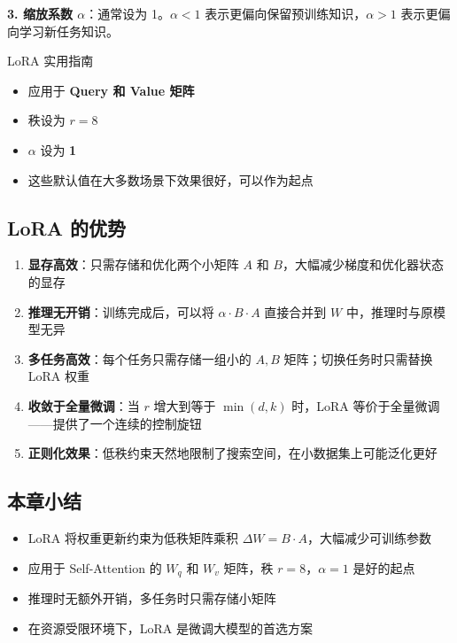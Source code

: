 \documentclass[a4paper]{article}
\begin{document}
\textbf{3. 缩放系数 $\alpha$}：通常设为 1。$\alpha < 1$ 表示更偏向保留预训练知识，$\alpha > 1$ 表示更偏向学习新任务知识。

\begin{importantbox}{LoRA 实用指南}
\begin{itemize}
    \item 应用于 \textbf{Query 和 Value 矩阵}
    \item 秩设为 \textbf{$r = 8$}
    \item $\alpha$ 设为 \textbf{1}
    \item 这些默认值在大多数场景下效果很好，可以作为起点
\end{itemize}
\end{importantbox}

\subsection{LoRA 的优势}





\begin{enumerate}
    \item \textbf{显存高效}：只需存储和优化两个小矩阵 $A$ 和 $B$，大幅减少梯度和优化器状态的显存
    \item \textbf{推理无开销}：训练完成后，可以将 $\alpha \cdot B \cdot A$ 直接合并到 $W$ 中，推理时与原模型无异
    \item \textbf{多任务高效}：每个任务只需存储一组小的 $A, B$ 矩阵；切换任务时只需替换 LoRA 权重
    \item \textbf{收敛于全量微调}：当 $r$ 增大到等于 $\min(d, k)$ 时，LoRA 等价于全量微调——提供了一个连续的控制旋钮
    \item \textbf{正则化效果}：低秩约束天然地限制了搜索空间，在小数据集上可能泛化更好
\end{enumerate}

\subsection{本章小结}

\begin{itemize}
    \item LoRA 将权重更新约束为低秩矩阵乘积 $\Delta W = B \cdot A$，大幅减少可训练参数
    \item 应用于 Self-Attention 的 $W_q$ 和 $W_v$ 矩阵，秩 $r = 8$，$\alpha = 1$ 是好的起点
    \item 推理时无额外开销，多任务时只需存储小矩阵
    \item 在资源受限环境下，LoRA 是微调大模型的首选方案
\end{itemize}
\end{document}
